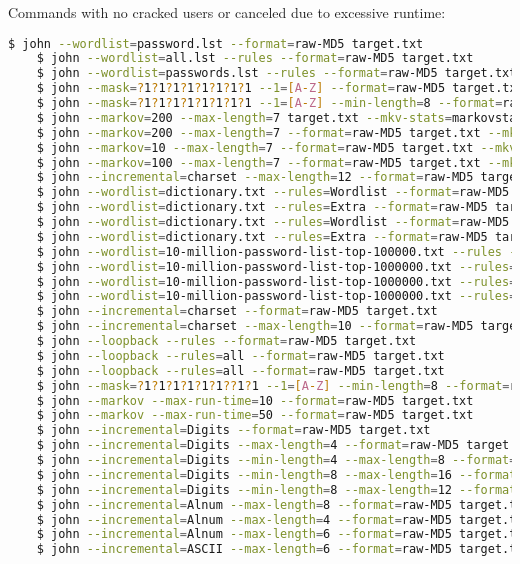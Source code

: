\documentclass[12pt]{exam}
\begin{document}
\noindent
Commands with no cracked users or canceled due to excessive runtime:
\begin{lstlisting}[language=bash]
    $ john --wordlist=password.lst --format=raw-MD5 target.txt 
    $ john --wordlist=all.lst --rules --format=raw-MD5 target.txt 
    $ john --wordlist=passwords.lst --rules --format=raw-MD5 target.txt 
    $ john --mask=?1?1?1?1?1?1?1?1 --1=[A-Z] --format=raw-MD5 target.txt 
    $ john --mask=?1?1?1?1?1?1?1?1 --1=[A-Z] --min-length=8 --format=raw-MD5 target.txt 
    $ john --markov=200 --max-length=7 target.txt --mkv-stats=markovstats 
    $ john --markov=200 --max-length=7 --format=raw-MD5 target.txt --mkv-stats=markovstats 
    $ john --markov=10 --max-length=7 --format=raw-MD5 target.txt --mkv-stats=markovstats 
    $ john --markov=100 --max-length=7 --format=raw-MD5 target.txt --mkv-stats=markovstats 
    $ john --incremental=charset --max-length=12 --format=raw-MD5 target.txt 
    $ john --wordlist=dictionary.txt --rules=Wordlist --format=raw-MD5 target.txt 
    $ john --wordlist=dictionary.txt --rules=Extra --format=raw-MD5 target.txt 
    $ john --wordlist=dictionary.txt --rules=Wordlist --format=raw-MD5 target.txt 
    $ john --wordlist=dictionary.txt --rules=Extra --format=raw-MD5 target.txt 
    $ john --wordlist=10-million-password-list-top-100000.txt --rules --format=raw-MD5 target.txt 
    $ john --wordlist=10-million-password-list-top-1000000.txt --rules=Single --format=raw-MD5 target.txt 
    $ john --wordlist=10-million-password-list-top-1000000.txt --rules=Single --format=raw-MD5 target.txt 
    $ john --wordlist=10-million-password-list-top-1000000.txt --rules=KoreLogic --format=raw-MD5 target.txt 
    $ john --incremental=charset --format=raw-MD5 target.txt 
    $ john --incremental=charset --max-length=10 --format=raw-MD5 target.txt
    $ john --loopback --rules --format=raw-MD5 target.txt 
    $ john --loopback --rules=all --format=raw-MD5 target.txt 
    $ john --loopback --rules=all --format=raw-MD5 target.txt 
    $ john --mask=?1?1?1?1?1?1??1?1 --1=[A-Z] --min-length=8 --format=raw-MD5 target.txt 
    $ john --markov --max-run-time=10 --format=raw-MD5 target.txt 
    $ john --markov --max-run-time=50 --format=raw-MD5 target.txt 
    $ john --incremental=Digits --format=raw-MD5 target.txt 
    $ john --incremental=Digits --max-length=4 --format=raw-MD5 target.txt 
    $ john --incremental=Digits --min-length=4 --max-length=8 --format=raw-MD5 target.txt 
    $ john --incremental=Digits --min-length=8 --max-length=16 --format=raw-MD5 target.txt 
    $ john --incremental=Digits --min-length=8 --max-length=12 --format=raw-MD5 target.txt 
    $ john --incremental=Alnum --max-length=8 --format=raw-MD5 target.txt 
    $ john --incremental=Alnum --max-length=4 --format=raw-MD5 target.txt 
    $ john --incremental=Alnum --max-length=6 --format=raw-MD5 target.txt 
    $ john --incremental=ASCII --max-length=6 --format=raw-MD5 target.txt 
\end{lstlisting}
\end{document}
